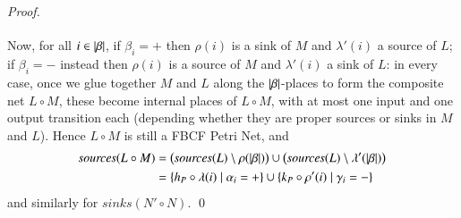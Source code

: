 \begin{proof}
\[\begin{tikzcd}[column sep=3em]
\end{tikzcd}
\]
Now, for all $i \in \lvert \beta \rvert$, if $\beta_i=+$ then $\rho(i)$ is a sink of $M$ and $\lambda'(i)$ a source of $L$; if $\beta_i=-$ instead then $\rho(i)$ is a source of $M$ and $\lambda'(i)$ a sink of $L$: in every case, once we glue together $M$ and $L$ along the $\lvert \beta \rvert$-places to form the composite net $L \circ M$, these become internal places of $L \circ M$, with at most one input and one output transition each (depending whether they are proper sources or sinks in $M$ and $L$). Hence $L \circ M$ is still a FBCF Petri Net, and 
\begin{align*}
\mathit{sources}(L \circ M) &= \bigl(\mathit{sources} (L) \setminus \rho(\lvert \beta \rvert) \bigr) \cup
\bigl(\mathit{sources} (L)\setminus \lambda'(\lvert \beta \rvert) \bigr) \\
&= \{h_P \circ \lambda(i) \mid \alpha_i = +\} \cup \{k_P \circ \rho'(i) \mid \gamma_i =-\}
\end{align*}
and similarly for $\mathit{sinks}(N' \circ N)$. \qed
\end{proof}



